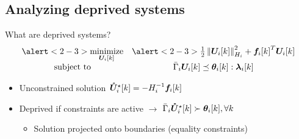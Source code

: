 \documentclass[aspectratio=169]{beamer}
\begin{document}
\subsection{Analyzing deprived systems}
\begin{frame}{What are deprived systems?}
  \centering
  \begin{equation*}
    \begin{matrix}
      \alert<2-3>{\minimize\limits_{\vec{U}_{i}[k]}}&\alert<2-3>{\frac{1}{2}\norm{\vec{U}_{i}[k]}^{2}_{H_{i}} + {\vec{f}_{i}[k]}^{T}\vec{U}_{i}[k]}\\
      \mathrm{subject~ to} & \bar{\Gamma}_{i}\vec{U}_{i}[k] \preceq \thetaik:\lambdaik
    \end{matrix}
  \end{equation*}
  \begin{itemize}
    \item<3-> Unconstrained solution $\optuncUik=-H_{i}^{-1}\vec{f}_{i}[k]$
    \item<4-> Deprived if constraints are active $\to$ $\bar{\Gamma}_{i}\optuncUik\succ \thetaik, \forall k$
  \begin{itemize}
    \item<5-> Solution projected onto boundaries (equality constraints)
  \end{itemize}
  \end{itemize}
  \begin{figure}[h]
    \centering
  \end{figure}
\end{frame}
\end{document}
